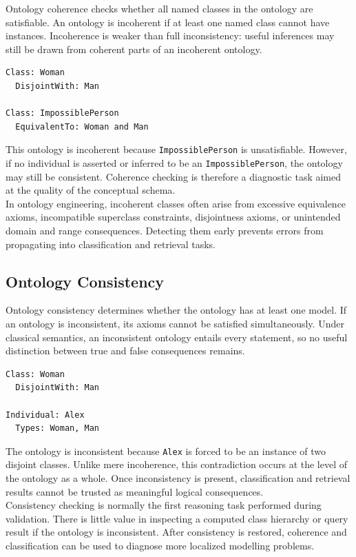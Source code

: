 \documentclass{scrbook}
\begin{document}
	Ontology coherence checks whether all named classes in the ontology are satisfiable. An ontology is incoherent if at least one named class cannot have instances. Incoherence is weaker than full inconsistency: useful inferences may still be drawn from coherent parts of an incoherent ontology.
	
	\begin{lstlisting}
Class: Woman
  DisjointWith: Man

Class: ImpossiblePerson
  EquivalentTo: Woman and Man
	\end{lstlisting}
	
	This ontology is incoherent because \texttt{ImpossiblePerson} is unsatisfiable. However, if no individual is asserted or inferred to be an \texttt{ImpossiblePerson}, the ontology may still be consistent. Coherence checking is therefore a diagnostic task aimed at the quality of the conceptual schema.\\
	
	In ontology engineering, incoherent classes often arise from excessive equivalence axioms, incompatible superclass constraints, disjointness axioms, or unintended domain and range consequences. Detecting them early prevents errors from propagating into classification and retrieval tasks.
	
	\subsection{Ontology Consistency}
	
	Ontology consistency determines whether the ontology has at least one model. If an ontology is inconsistent, its axioms cannot be satisfied simultaneously. Under classical semantics, an inconsistent ontology entails every statement, so no useful distinction between true and false consequences remains.
	
	\begin{lstlisting}
Class: Woman
  DisjointWith: Man

Individual: Alex
  Types: Woman, Man
	\end{lstlisting}
	
	The ontology is inconsistent because \texttt{Alex} is forced to be an instance of two disjoint classes. Unlike mere incoherence, this contradiction occurs at the level of the ontology as a whole. Once inconsistency is present, classification and retrieval results cannot be trusted as meaningful logical consequences.\\
	
	Consistency checking is normally the first reasoning task performed during validation. There is little value in inspecting a computed class hierarchy or query result if the ontology is inconsistent. After consistency is restored, coherence and classification can be used to diagnose more localized modelling problems.
	
\end{document}
